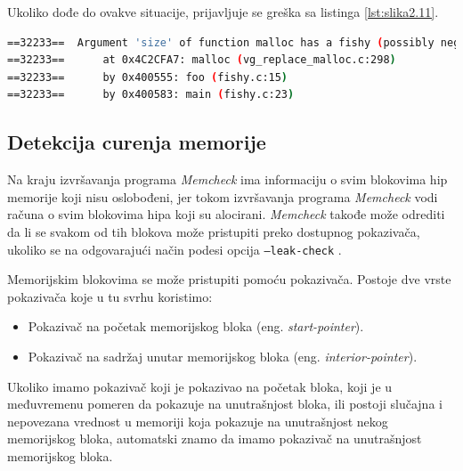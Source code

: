 \documentclass[12pt,oneside]{memoir}
\theoremstyle{plain}
\theoremstyle{definition}
\begin{document}
Ukoliko dođe do ovakve situacije, prijavljuje se greška sa listinga \ref{lst:slika2.11}. 

\begin{lstlisting}[style=terminal,caption={Primer ispisa greške sumnjive vrednosti argumenata \cite{Memcheck}}, label={lst:slika2.11},language={bash}] 
==32233==  Argument 'size' of function malloc has a fishy (possibly negative) value: -3
==32233==      at 0x4C2CFA7: malloc (vg_replace_malloc.c:298)
==32233==      by 0x400555: foo (fishy.c:15)
==32233==      by 0x400583: main (fishy.c:23)
\end{lstlisting}

\subsection{Detekcija curenja memorije}
Na kraju izvršavanja programa \textit{Memcheck} ima informaciju o svim blokovima hip memorije koji nisu oslobođeni, jer tokom izvršavanja programa \textit{Memcheck} vodi računa o svim blokovima hipa koji su alocirani. \textit{Memcheck} takođe može odrediti da li se svakom od tih blokova može pristupiti preko dostupnog pokazivača, ukoliko se na odgovarajući način podesi opcija \texttt{--leak-check} \cite{ValgrindDOC}.

Memorijskim blokovima se može pristupiti pomoću pokazivača. Postoje dve vrste pokazivača koje u tu svrhu koristimo:
\begin{itemize}
\item Pokazivač na početak memorijskog bloka (eng. \textit{start-pointer}).
\item Pokazivač na sadržaj unutar memorijskog bloka (eng. \textit{interior-pointer}).
\end{itemize}

Ukoliko imamo pokazivač koji je pokazivao na početak bloka, koji je u međuvremenu pomeren da pokazuje na unutrašnjost bloka, ili postoji slučajna i nepovezana vrednost u memoriji koja pokazuje na unutrašnjost nekog memorijskog bloka, automatski znamo da imamo pokazivač na unutrašnjost memorijskog bloka. 
\end{document}
